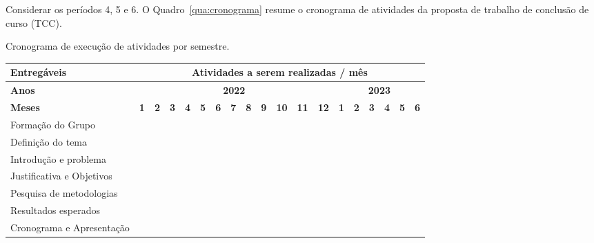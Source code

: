 \justify
Considerar os períodos 4, 5 e 6.
O Quadro~\ref{qua:cronograma} resume o cronograma de atividades da proposta de trabalho de conclusão de curso (TCC).


\begin{quadro}[H]
    \begin{center}
	    \caption{Cronograma de execução de atividades por semestre.}
		\label{qua:cronograma}
		\begin{tabular}{|m{3.5cm}|m{.2cm}|m{.2cm}|m{.2cm}|m{.2cm}|m{.2cm}|m{.2cm}|m{.2cm}|m{.2cm}|m{.2cm}|m{.2cm}|m{.2cm}|m{.2cm}|m{.2cm}|m{.2cm}|m{.2cm}|m{.2cm}|m{.2cm}|m{.2cm}|}
			\hline
			\centering
			\cellcolor{gray!50}\textbf{Entregáveis} & \multicolumn{18}{c|}{ \cellcolor{gray!50}\textbf{Atividades a serem realizadas / mês}}\\
			\hline
		    \centering
			\textbf{Anos} & \multicolumn{12}{c|}{\textbf{2022}} & \multicolumn{6}{c|}{\textbf{2023}} \\
			\hline
			\centering
            \cellcolor{gray!50}\textbf{Meses}&\cellcolor{gray!50}\textbf{1}&\cellcolor{gray!50}\textbf{2}&\cellcolor{gray!50}\textbf{3}&\cellcolor{gray!50}\textbf{4}&\cellcolor{gray!50}\textbf{5}&\cellcolor{gray!50}\textbf{6}&\cellcolor{gray!50}\textbf{7}&\cellcolor{gray!50}\textbf{8}&\cellcolor{gray!50}\textbf{9}&\cellcolor{gray!50}\textbf{10}&\cellcolor{gray!50}\textbf{11}&\cellcolor{gray!50}\textbf{12}&\cellcolor{gray!50}\textbf{1}&\cellcolor{gray!50}\textbf{2}&\cellcolor{gray!50}\textbf{3}&\cellcolor{gray!50}\textbf{4} &\cellcolor{gray!50}\textbf{5} &\cellcolor{gray!50}\textbf{6}\\
			\hline
			Formação do Grupo &\cellcolor{gray!50} & & & & & & & & & & & & & & & & & \\
			\hline
			Definição do tema &\cellcolor{gray!50} & & & & & & & & & & & & & & & & & \\
			\hline
			Introdução e problema &\cellcolor{gray!50} & & & & & & & & & & & & & & & & & \\
			\hline
			Justificativa e Objetivos & &\cellcolor{gray!50} & & & & & & & & & & & & & & & & \\
			\hline
			Pesquisa de metodologias & & &\cellcolor{gray!50} &\cellcolor{gray!50} & & & & & & & & & & & & & & \\
			\hline
			Resultados esperados & & & & &\cellcolor{gray!50} & & & & & & & & & & & & &\\
			\hline
			Cronograma e Apresentação & & & & &\cellcolor{gray!50} & & & & & & & & & & & & & \\
			\hline

\end{tabular}
\end{center}
\end{quadro}
